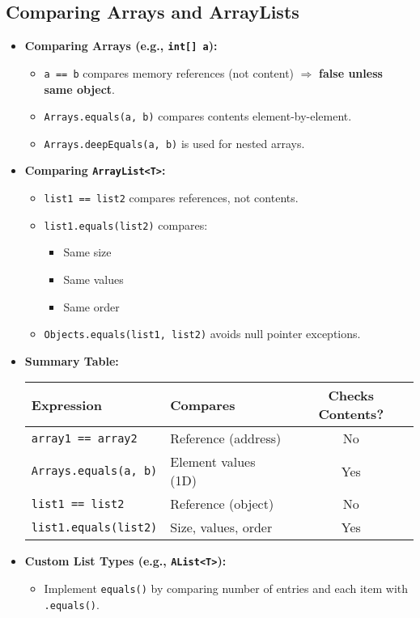 \documentclass[11pt]{article}
\begin{document}
\subsection*{Comparing Arrays and ArrayLists}
\begin{itemize}[leftmargin=*]
\item \textbf{Comparing Arrays (e.g., \texttt{int[] a}):}
  \begin{itemize}
    \item \texttt{a == b} compares memory references (not content) $\Rightarrow$ \textbf{false unless same object}.
    \item \texttt{Arrays.equals(a, b)} compares contents element-by-element.
    \item \texttt{Arrays.deepEquals(a, b)} is used for nested arrays.
  \end{itemize}

\item \textbf{Comparing \texttt{ArrayList<T>}:}
  \begin{itemize}
    \item \texttt{list1 == list2} compares references, not contents.
    \item \texttt{list1.equals(list2)} compares:
      \begin{itemize}
        \item Same size
        \item Same values
        \item Same order
      \end{itemize}
    \item \texttt{Objects.equals(list1, list2)} avoids null pointer exceptions.
  \end{itemize}

\item \textbf{Summary Table:}
\begin{center}
\begin{tabular}{|l|l|c|}
\hline
\textbf{Expression} & \textbf{Compares} & \textbf{Checks Contents?} \\
\hline
\texttt{array1 == array2} & Reference (address) & No \\
\texttt{Arrays.equals(a, b)} & Element values (1D) & Yes \\
\texttt{list1 == list2} & Reference (object) & No \\
\texttt{list1.equals(list2)} & Size, values, order & Yes \\
\hline
\end{tabular}
\end{center}

\item \textbf{Custom List Types (e.g., \texttt{AList<T>}):}
  \begin{itemize}
    \item Implement \texttt{equals()} by comparing number of entries and each item with \texttt{.equals()}.
  \end{itemize}
\end{itemize}
\end{document}
